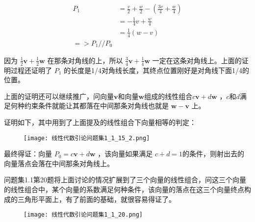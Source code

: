 \documentclass[12pt,oneside]{book}
\begin{document}
\begin{align*}
P_1 &= \frac{v}{2} + \frac{w}{2} - (\frac{3v}{4} + \frac{w}{4}) \\
    &= -\frac{1}{4}v + \frac{w}{4} \\
    &= \frac{1}{4}(w-v) \\    
 => P_1 // P_0
\end{align*}

因为 $\frac{1}{2}\boldsymbol{v} + \frac{1}{2}\boldsymbol{w}$ 在那条对角线的上，所以 $\frac{3}{4}\boldsymbol{v} + \frac{1}{4}\boldsymbol{w}$ 一定在这条对角线上。上面的证明过程还证明了 $P_1$ 的长度是1/4对角线长度，其终点位置刚好是对角线下面1/4的位置。

上面的证明还可以继续推广，问向量$\boldsymbol{v}$和向量$\boldsymbol{w}$组成的线性组合$c\boldsymbol{v} + d\boldsymbol{w}$ ，$c$和$d$满足何种约束条件就能让其都落在中间那条对角线也就是 $\boldsymbol{w} - \boldsymbol{v}$ 上。

证明如下，其中用到了上面提及的线性组合下向量相等的判定：

\begin{figure}[H]
\centering
\texttt{[image: 线性代数引论问题集1\_1\_15\_2.png]}
\end{figure}

最终得证：向量 $P_0 = c\boldsymbol{v}+d\boldsymbol{w}$ ，该向量如果满足 $c+d=1$的条件，则射出去的向量落点会落在中间那条对角线上。


\cite{线性代数引论}问题集1.1第20题将上面讨论的情况扩展到了三个向量的线性组合，问这三个向量的线性组合中，某个向量的系数满足何种条件，该向量的落点在这三个向量终点构成的三角形平面上，有了前面的基础，就很容易得证了。


\begin{figure}[H]
\centering
\texttt{[image: 线性代数引论问题集1\_1\_20.png]}
\end{figure}



\backmatter
\end{document}
